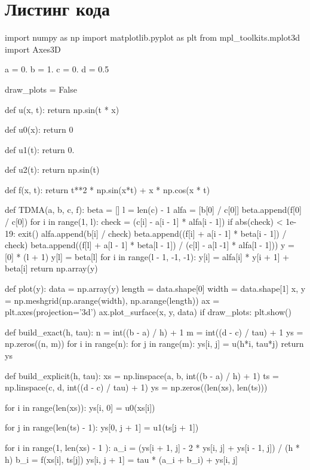 \documentclass{article}
\begin{document}
\section*{Листинг кода}
\begin{python}
import numpy as np
import matplotlib.pyplot as plt
from mpl_toolkits.mplot3d import Axes3D

a = 0.
b = 1.
c = 0.
d = 0.5

draw_plots = False

def u(x, t):
    return np.sin(t * x)

def u0(x):
    return 0

def u1(t):
    return 0.

def u2(t):
    return np.sin(t)
    
def f(x, t):
    return t**2 * np.sin(x*t) + x * np.cos(x * t)

def TDMA(a, b, c, f):
    beta = []
    l = len(c) - 1
    alfa = [b[0] / c[0]]
    beta.append(f[0] / c[0])
    for i in range(1, l):
        check = (c[i] - a[i - 1] * alfa[i - 1])
        if abs(check) < 1e-19: exit()
        alfa.append(b[i] / check)
        beta.append((f[i] + a[i - 1] * beta[i - 1]) / check)
    beta.append((f[l] + a[l - 1] * beta[l - 1]) / (c[l] - a[l -1] * alfa[l - 1]))
    y = [0] * (l + 1)
    y[l] = beta[l]
    for i in range(l - 1, -1, -1):
        y[i] = alfa[i] * y[i + 1] + beta[i]
    return np.array(y)

def plot(y):
    data = np.array(y)
    length = data.shape[0]
    width = data.shape[1]
    x, y = np.meshgrid(np.arange(width), np.arange(length))
    ax = plt.axes(projection='3d')
    ax.plot_surface(x, y, data)
    if draw_plots:
        plt.show()

def build_exact(h, tau):
    n = int((b - a) / h) + 1
    m = int((d - c) / tau) + 1
    ys = np.zeros((n, m))
    for i in range(n):
        for j in range(m):
            ys[i, j] = u(h*i, tau*j)
    return ys

def build_explicit(h, tau):
    xs = np.linspace(a, b, int((b - a) / h) + 1)
    ts = np.linspace(c, d, int((d - c) / tau) + 1)
    ys = np.zeros((len(xs), len(ts)))
    
    for i in range(len(xs)):
        ys[i, 0] = u0(xs[i])
        
    for j in range(len(ts) - 1):
        ys[0, j + 1] = u1(ts[j + 1])
        
        for i in range(1, len(xs) - 1 ):
            a_i = (ys[i + 1, j] - 2 * ys[i, j] + ys[i - 1, j]) / (h * h)
            b_i = f(xs[i], ts[j])
            ys[i, j + 1] = tau * (a_i + b_i) + ys[i, j]
            

\end{python}
\end{document}
